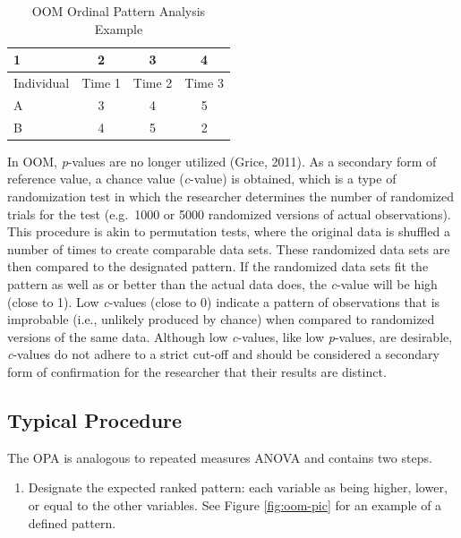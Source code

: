 \documentclass[english,man]{apa6}
\providecommand{\tightlist}{%
  \setlength{\itemsep}{0pt}\setlength{\parskip}{0pt}}
\theoremstyle{definition}
\theoremstyle{definition}
\theoremstyle{definition}
\theoremstyle{remark}
\begin{document}
\begin{table}[tbp]
\begin{center}
\begin{threeparttable}
\caption{\label{tab:oompattable}OOM Ordinal Pattern Analysis Example}
\begin{tabular}{lccc}
\toprule
1 & \multicolumn{1}{c}{2} & \multicolumn{1}{c}{3} & \multicolumn{1}{c}{4}\\
\midrule
Individual & Time 1 & Time 2 & Time 3\\
A & 3 & 4 & 5\\
B & 4 & 5 & 2\\
\bottomrule
\end{tabular}
\end{threeparttable}
\end{center}
\end{table}

In OOM, \emph{p}-values are no longer utilized (Grice, 2011). As a
secondary form of reference value, a chance value (\emph{c}-value) is
obtained, which is a type of randomization test in which the researcher
determines the number of randomized trials for the test (e.g.~1000 or
5000 randomized versions of actual observations). This procedure is akin
to permutation tests, where the original data is shuffled a number of
times to create comparable data sets. These randomized data sets are
then compared to the designated pattern. If the randomized data sets fit
the pattern as well as or better than the actual data does, the
\emph{c}-value will be high (close to 1). Low \emph{c}-values (close to
0) indicate a pattern of observations that is improbable (i.e., unlikely
produced by chance) when compared to randomized versions of the same
data. Although low \emph{c}-values, like low \emph{p}-values, are
desirable, \emph{c}-values do not adhere to a strict cut-off and should
be considered a secondary form of confirmation for the researcher that
their results are distinct.

\subsection{Typical Procedure}\label{typical-procedure-1}

The OPA is analogous to repeated measures ANOVA and contains two steps.

\begin{enumerate}
\def\labelenumi{\arabic{enumi})}
\tightlist
\item
  Designate the expected ranked pattern: each variable as being higher,
  lower, or equal to the other variables. See Figure \ref{fig:oom-pic}
  for an example of a defined pattern.
\end{enumerate}
\end{document}
